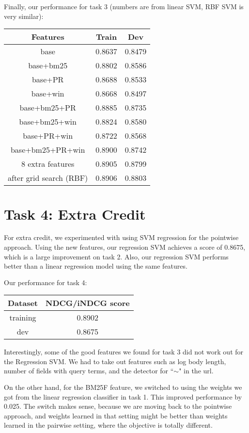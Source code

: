 \documentclass[10pt,twocolumn]{article}
\begin{document}
Finally, our performance for task 3 (numbers are from linear SVM, RBF SVM is very similar):
\begin{table}[H] 
\centering
\begin{tabular}{|c|c|c|}
\hline
Features &Train& Dev \\\hline
base & 0.8637 & 0.8479\\\hline
base+bm25 & 0.8802 & 0.8586\\\hline
base+PR & 0.8688 & 0.8533\\\hline
base+win & 0.8668 & 0.8497\\\hline
base+bm25+PR & 0.8885 & 0.8735\\\hline
base+bm25+win & 0.8824 & 0.8580\\\hline
base+PR+win & 0.8722 & 0.8568\\\hline
base+bm25+PR+win & 0.8900 & 0.8742\\\hline
8 extra features & 0.8905 & 0.8799\\\hline
after grid search (RBF)  & 0.8906 & 0.8803\\\hline
\end{tabular}
\end{table}

\section*{Task 4: Extra Credit}
For extra credit, we experimented with using SVM regression for the pointwise approach. Using the new features, our regression SVM achieves a score of 0.8675, which is a large improvement on task 2. Also, our regression SVM performs better than a linear regression model using the same features.

Our performance for task 4:
\begin{table}[H]
\centering
\begin{tabular}{|c|c|}
\hline
Dataset & NDCG/iNDCG score \\\hline
training & 0.8902\\\hline
dev & 0.8675\\\hline
\end{tabular}
\end{table}

Interestingly, some of the good features we found for task 3 did not work out for the Regression SVM. We had to take out features such as log body length, number of fields with query terms, and the detector for ``$\sim$" in the url.

On the other hand, for the BM25F feature, we switched to using the weights we got from the linear regression classifier in task 1. This improved performance by 0.025. The switch makes sense, because we are moving back to the pointwise approach, and weights learned in that setting might be better than weights learned in the pairwise setting, where the objective is totally different.
\end{document}
